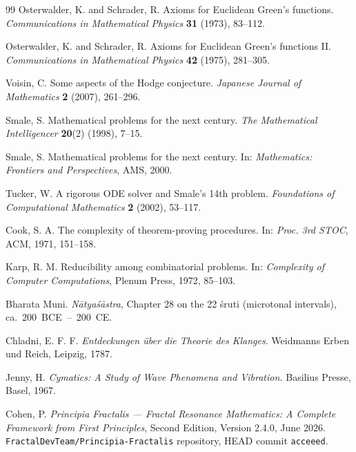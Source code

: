 \documentclass[11pt,a4paper]{article}
\theoremstyle{definition}
\begin{document}
\begin{thebibliography}{99}
 Osterwalder, K. and Schrader, R.
Axioms for Euclidean Green's functions. \emph{Communications in
Mathematical Physics} \textbf{31} (1973), 83--112.

 Osterwalder, K. and Schrader, R.
Axioms for Euclidean Green's functions II. \emph{Communications in
Mathematical Physics} \textbf{42} (1975), 281--305.

 Voisin, C. Some aspects of the Hodge
conjecture. \emph{Japanese Journal of Mathematics} \textbf{2}
(2007), 261--296.

 Smale, S. Mathematical
problems for the next century. \emph{The Mathematical Intelligencer}
\textbf{20}(2) (1998), 7--15.

 Smale, S. Mathematical problems for
the next century. In: \emph{Mathematics: Frontiers and Perspectives},
AMS, 2000.

 Tucker, W. A rigorous ODE solver and
Smale's 14th problem. \emph{Foundations of Computational
Mathematics} \textbf{2} (2002), 53--117.

 Cook, S. A. The complexity of theorem-proving
procedures. In: \emph{Proc. 3rd STOC}, ACM, 1971, 151--158.

 Karp, R. M. Reducibility among combinatorial
problems. In: \emph{Complexity of Computer Computations}, Plenum
Press, 1972, 85--103.

 Bharata Muni. \emph{N\=atya\'s\=astra},
Chapter 28 on the 22 \'sruti (microtonal intervals),
ca.~200~BCE~--~200~CE.

 Chladni, E. F. F. \emph{Entdeckungen \"uber
die Theorie des Klanges}. Weidmanns Erben und Reich, Leipzig, 1787.

 Jenny, H. \emph{Cymatics: A Study of
Wave Phenomena and Vibration.} Basilius Presse, Basel, 1967.

 Cohen, P. \emph{Principia Fractalis ---
Fractal Resonance Mathematics: A Complete Framework from First
Principles}, Second Edition, Version 2.4.0, June 2026.
\texttt{FractalDevTeam/Principia-Fractalis} repository, HEAD commit
\texttt{acceeed}.

\end{thebibliography}
\end{document}
